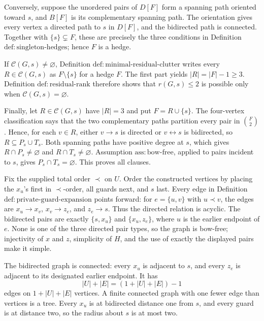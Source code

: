 Conversely, suppose the unordered pairs of \(D[F]\) form a spanning path
oriented toward \(s\), and \(B[F]\) is its complementary spanning path.
The orientation gives every vertex a directed path to \(s\) in \(D[F]\),
and the bidirected path is connected.  Together with
\(\{s\}\subsetneq F\), these are precisely the three conditions in
Definition \(\mathrm{def{:}singleton\mbox{-}hedges}\); hence \(F\) is a
hedge.

If \(\mathcal C(G,s)\neq\varnothing\), Definition
\(\mathrm{def{:}minimal\mbox{-}residual\mbox{-}clutter}\) writes every
\(R\in\mathcal C(G,s)\) as \(F\setminus\{s\}\) for a hedge \(F\).
The first part yields \(|R|=|F|-1\geq3\).  Definition
\(\mathrm{def{:}residual\mbox{-}rank}\) therefore shows that
\(r(G,s)\leq2\) is possible only when \(\mathcal C(G,s)=\varnothing\).

Finally, let \(R\in\mathcal C(G,s)\) have \(|R|=3\) and put
\(F=R\cup\{s\}\).  The four-vertex classification says that the two
complementary paths partition every pair in \(\binom F2\).  Hence, for each
\(v\in R\), either \(v\to s\) is directed or \(v\leftrightarrow s\) is
bidirected, so \(R\subseteq P_s\cup T_s\).  Both spanning paths have
positive degree at \(s\), which gives
\(R\cap P_s\neq\varnothing\) and \(R\cap T_s\neq\varnothing\).
Assumption \(\mathrm{ass{:}bow\mbox{-}free}\), applied to pairs incident
to \(s\), gives \(P_s\cap T_s=\varnothing\).  This proves all clauses.

Fix the supplied total order \(\prec\) on \(U\).  Order the constructed
vertices by placing the \(x_u\)'s first in \(\prec\)-order, all guards
next, and \(s\) last.  Every edge in Definition
\(\mathrm{def{:}private\mbox{-}guard\mbox{-}expansion}\) points forward:
for \(e=\{u,v\}\) with \(u\prec v\), the edges are
\(x_u\to x_v\), \(x_v\to z_e\), and \(z_e\to s\).  Thus the directed
relation is acyclic.  The bidirected pairs are exactly
\(\{s,x_u\}\) and \(\{x_u,z_e\}\), where \(u\) is the earlier endpoint
of \(e\).  None is one of the three directed pair types, so the graph is
bow-free; injectivity of \(x\) and \(z\), simplicity of \(H\), and the use
of exactly the displayed pairs make it simple.

The bidirected graph is connected: every \(x_u\) is adjacent to \(s\), and
every \(z_e\) is adjacent to its designated earlier endpoint.  It has
\[
 |U|+|E|=(1+|U|+|E|)-1
\]
edges on \(1+|U|+|E|\) vertices.  A finite connected graph with one fewer
edge than vertices is a tree.  Every \(x_u\) is at bidirected distance one
from \(s\), and every guard is at distance two, so the radius about \(s\)
is at most two.

